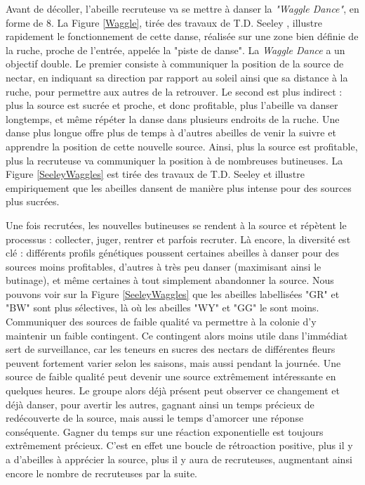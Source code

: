 	Avant de décoller, l'abeille recruteuse va se mettre à danser la \textit{"Waggle Dance"}, en forme de 8. La Figure \ref{Waggle}, tirée des travaux de T.D. Seeley \cite{seeley_wisdom_1995}, illustre rapidement le fonctionnement de cette danse, réalisée sur une zone bien définie de la ruche, proche de l'entrée, appelée la "piste de danse". La \textit{Waggle Dance} a un objectif double. Le premier consiste à communiquer la position de la source de nectar, en indiquant sa direction par rapport au soleil ainsi que sa distance à la ruche, pour permettre aux autres de la retrouver. Le second est plus indirect : plus la source est sucrée et proche, et donc profitable, plus l'abeille va danser longtemps, et même répéter la danse dans plusieurs endroits de la ruche. Une danse plus longue offre plus de temps à d'autres abeilles de venir la suivre et apprendre la position de cette nouvelle source. Ainsi, plus la source est profitable, plus la recruteuse va communiquer la position à de nombreuses butineuses. La Figure \ref{SeeleyWaggles} est tirée des travaux de T.D. Seeley \cite{seeley_wisdom_1995} et illustre empiriquement que les abeilles dansent de manière plus intense pour des sources plus sucrées.
			
			Une fois recrutées, les nouvelles butineuses se rendent à la source et répètent le processus : collecter, juger, rentrer et parfois recruter. Là encore, la diversité est clé : différents profils génétiques poussent certaines abeilles à danser pour des sources moins profitables, d'autres à très peu danser (maximisant ainsi le butinage), et même certaines à tout simplement abandonner la source. Nous pouvons voir sur la Figure \ref{SeeleyWaggles} que les abeilles labellisées "GR" et "BW" sont plus sélectives, là où les abeilles "WY" et "GG" le sont moins. Communiquer des sources de faible qualité va permettre à la colonie d'y maintenir un faible contingent. Ce contingent alors moins utile dans l'immédiat sert de surveillance, car les teneurs en sucres des nectars de différentes fleurs peuvent fortement varier selon les saisons, mais aussi pendant la journée. 
			Une source de faible qualité peut devenir une source extrêmement intéressante en quelques heures. Le groupe alors déjà présent peut observer ce changement et déjà danser, pour avertir les autres, gagnant ainsi un temps précieux de redécouverte de la source, mais aussi le temps d'amorcer une réponse conséquente. Gagner du temps sur une réaction exponentielle est toujours extrêmement précieux. 
			C'est en effet une boucle de rétroaction positive, plus il y a d'abeilles à apprécier la source, plus il y aura de recruteuses, augmentant ainsi encore le nombre de recruteuses par la suite.
			
